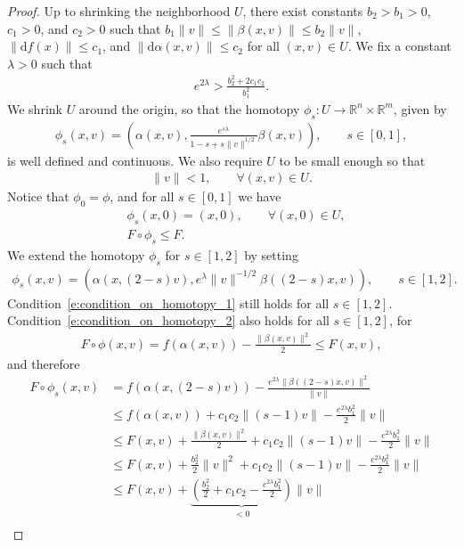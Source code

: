 \documentclass[reqno]{amsart}
\numberwithin{equation}{section}
\theoremstyle{personal}%
\theoremstyle{definition}
\newcommand{\R}{\mathds{R}}
\newcommand{\diff}{\mathrm{d}}
\begin{document}
\begin{proof}
Up to shrinking the neighborhood $U$, there exist constants $b_2>b_1>0$, $c_1>0$, and $c_2>0$ such that $b_1\|v\|\leq\|\beta(x,v)\|\leq b_2\|v\|$, $\|\diff f(x)\|\leq c_1$, and $\|\diff\alpha(x,v)\|\leq c_2$ for all $(x,v)\in U$. We fix a constant $\lambda>0$ such that 
\begin{align*}
e^{2\lambda}
>
\frac{b_2^2+2c_1c_2}{b_1^2}.
\end{align*}
We shrink $U$ around the origin, so that the homotopy $\phi_s:U\to\R^n\times\R^m$, given by 
\begin{align*}
\phi_s(x,v)
=
\left(\alpha(x,v),\frac{e^{s\lambda}}{1-s+s\|v\|^{1/2}}\beta(x,v)\right),
\qquad
s\in[0,1],
\end{align*}
is well defined and continuous. We also require $U$ to be small enough so that
\begin{align*}
 \|v\|<1,\qquad\forall (x,v)\in U.
\end{align*}
Notice that $\phi_0=\phi$, and for all $s\in[0,1]$ we have
\begin{align}
\label{e:condition_on_homotopy_1}
 &\phi_s(x,0)=(x,0),\qquad\forall(x,0)\in U,\\
\label{e:condition_on_homotopy_2}
 &F\circ\phi_s\leq F.
\end{align}
We extend the homotopy $\phi_s$ for $s\in[1,2]$ by setting
\begin{align*}
\phi_s(x,v)
=
\left(\alpha(x,(2-s)v),e^{\lambda}\|v\|^{-1/2}\beta((2-s)x,v)\right),
\qquad
s\in[1,2].
\end{align*}
Condition~\eqref{e:condition_on_homotopy_1} still holds for all $s\in[1,2]$. Condition~\eqref{e:condition_on_homotopy_2} also holds for all $s\in[1,2]$, for
\begin{align*}
F\circ\phi(x,v)
=
f(\alpha(x,v)) - \frac{\|\beta(x,v)\|^2}{2}
\leq
F(x,v),
\end{align*}
and therefore
\begin{align*}
F\circ\phi_s(x,v)
&=
f(\alpha(x,(2-s)v))
-
\frac{e^{2\lambda}\|\beta((2-s)x,v)\|^2}{\|v\|}\\
&\leq
f(\alpha(x,v)) + c_1c_2 \|(s-1)v\| - \frac{e^{2\lambda}b_1^2}{2}\|v\|\\
&\leq
F(x,v)+\frac{\|\beta(x,v)\|^2}{2} + c_1c_2 \|(s-1)v\| - \frac{e^{2\lambda}b_1^2}{2}\|v\|\\
&\leq
F(x,v)+\frac{b_2^2}{2}\|v\|^2 + c_1c_2 \|(s-1)v\| - \frac{e^{2\lambda}b_1^2}{2}\|v\|\\
&\leq
F(x,v)+\underbrace{\left(\frac{b_2^2}{2} + c_1c_2 - \frac{e^{2\lambda}b_1^2}{2}\right)}_{<0}\|v\|\\

\end{align*}
\end{proof}
\end{document}
